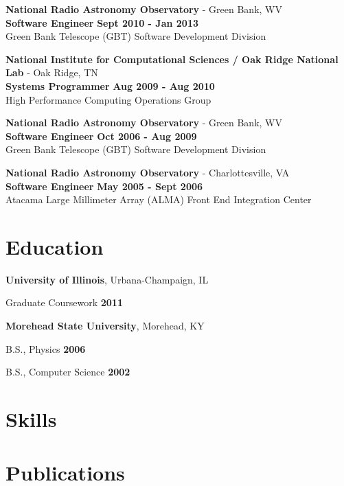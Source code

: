 \documentclass[margin,line]{res}
\newenvironment{list1}{
  \begin{list}{\ding{113}}{%
      \setlength{\itemsep}{0in}
      \setlength{\parsep}{0in} \setlength{\parskip}{0in}
      \setlength{\topsep}{0in} \setlength{\partopsep}{0in}
      \setlength{\leftmargin}{0.17in}}}{\end{list}}
\begin{document}
\begin{resume}
{\bf National Radio Astronomy Observatory} - Green Bank, WV\\
{\bf Software Engineer} \hfill {\bf Sept 2010 - Jan 2013}\\
Green Bank Telescope (GBT) Software Development Division

{\bf National Institute for Computational Sciences / Oak Ridge National Lab} - Oak Ridge, TN\\
{\bf Systems Programmer} \hfill {\bf Aug 2009 - Aug 2010}\\
High Performance Computing Operations Group

{\bf National Radio Astronomy Observatory} - Green Bank, WV\\
{\bf Software Engineer} \hfill {\bf Oct 2006 - Aug 2009}\\
Green Bank Telescope (GBT) Software Development Division

{\bf National Radio Astronomy Observatory} - Charlottesville, VA\\
{\bf Software Engineer} \hfill {\bf May 2005 - Sept 2006}\\
Atacama Large Millimeter Array (ALMA) Front End Integration Center

\section{\sc Education}

{\bf University of Illinois}, Urbana-Champaign, IL\\
\vspace*{-.1in}
\begin{list1}
\item[] Graduate Coursework \hfill {\bf 2011}
\end{list1}

{\bf Morehead State University}, Morehead, KY\\
\vspace*{-.1in}
\begin{list1}
\item[] B.S., Physics \hfill {\bf 2006}
\item[] B.S., Computer Science \hfill {\bf 2002}
\end{list1}

\section{\sc Skills}




\section{\sc Publications}




\end{resume}
\end{document}
